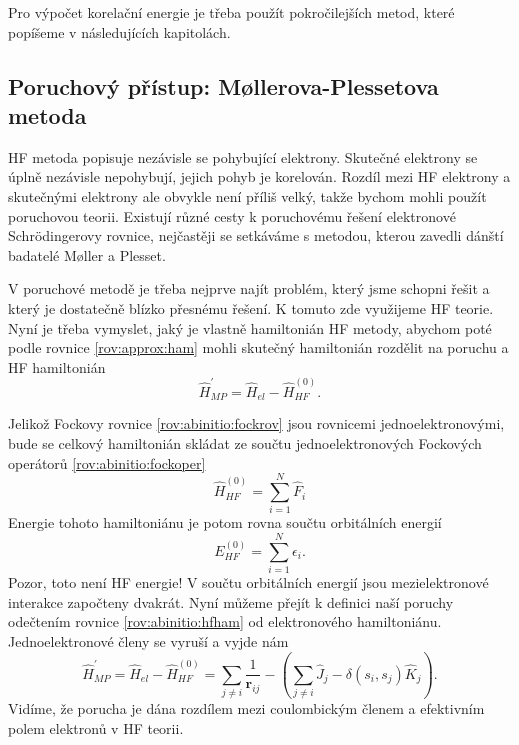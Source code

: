 Pro výpočet korelační energie je třeba použít pokročilejších metod, které popíšeme v následujících kapitolách.

\subsection{Poruchový přístup: M\o llerova-Plessetova metoda}
HF metoda popisuje nezávisle se pohybující elektrony. Skutečné elektrony se úplně nezávisle nepohybují, jejich pohyb je korelován. Rozdíl mezi HF elektrony a skutečnými elektrony ale obvykle není příliš velký, takže bychom mohli použít poruchovou teorii.  Existují různé cesty k poruchovému řešení elektronové Schr\"{o}dingerovy rovnice, nejčastěji se setkáváme s metodou, kterou zavedli dánští badatelé M\o ller a Plesset.

V poruchové metodě je třeba nejprve najít problém, který jsme schopni řešit a který je dostatečně blízko přesnému řešení. K tomuto zde využijeme HF teorie. Nyní je třeba vymyslet, jaký je vlastně hamiltonián HF metody, abychom poté podle rovnice \eqref{rov:approx:ham} mohli skutečný hamiltonián rozdělit na poruchu a HF hamiltonián
\begin{equation}
\hat{H}^{\prime}_{MP}=\hat{H}_{el} - \hat{H}^{(0)}_{HF} .
\end{equation}

Jelikož Fockovy rovnice \ref{rov:abinitio:fockrov} jsou rovnicemi jednoelektronovými, bude se celkový hamiltonián skládat ze součtu jednoelektronových Fockových operátorů \ref{rov:abinitio:fockoper}
\begin{equation}
\hat{H}^{(0)}_{HF}= \sum_{i=1}^N \hat{F}_i
\label{rov:abinitio:hfham}
\end{equation}
Energie tohoto hamiltoniánu je potom rovna součtu orbitálních energií
\begin{equation}
E^{(0)}_{HF}=\sum_{i=1}^N \epsilon_i .
\end{equation}
Pozor, toto není HF energie! V součtu orbitálních energií jsou mezielektronové interakce započteny dvakrát. Nyní můžeme přejít k definici naší poruchy odečtením rovnice \eqref{rov:abinitio:hfham} od elektronového hamiltoniánu. Jednoelektronové členy se vyruší a vyjde nám
\begin{equation}
\hat{H}^{\prime}_{MP}=\hat{H}_{el}-\hat{H}^{(0)}_{HF}= \sum_{j\neq i} \frac{1}{\textbf{r}_{ij}} - \left(\sum_{j\neq i} \hat{J}_j - \delta(s_i,s_j) \hat{K}_j \right) .
\end{equation}
Vidíme, že porucha je dána rozdílem mezi coulombickým členem a efektivním polem elektronů v HF teorii.

